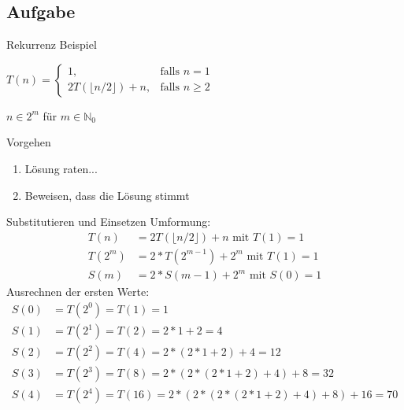 \documentclass[18pt]{beamer}
\begin{document}
\subsection{Aufgabe}
\begin{frame}{Rekurrenz Beispiel}
	\begin{center}
		$ T(n)=\left\{\begin{array}{cr} 1, & \mbox{falls } n = 1\\ 2 T(\lfloor n / 2 \rfloor) + n, & \mbox{falls } n \geq 2 \end{array}\right. $

		\parskip 14pt
		$n \in 2 ^{m} $ für $ m \in \mathbb{N} _{0} $

	\end{center}
	\begin{block}{Vorgehen}
		\begin{enumerate}
			\item Lösung raten...
			\item Beweisen, dass die Lösung stimmt
		\end{enumerate}
	\end{block}
\end{frame}

\begin{frame}{Substitutieren und Einsetzen}
	Umformung:
	\begin{align*}
		T(n) &= 2 T(\lfloor n / 2 \rfloor) + n \text{ mit } T(1) = 1\\
		T(2^m) &= 2* T(2^{m - 1}) + 2^m \text{ mit } T(1) = 1\\
		S(m) &= 2 * S(m-1) + 2^m \text{ mit } S(0) = 1
	\end{align*}
	Ausrechnen der ersten Werte:
	\begin{align*}
		S(0) &= T(2^0) = T(1)  = 1\\
		S(1) &= T(2^1) = T(2)  = 2 * 1 + 2 = 4\\
		S(2) &= T(2^2) = T(4)  = 2 * (2 * 1 + 2) + 4 = 12\\
		S(3) &= T(2^3) = T(8)  = 2 * (2 * (2 * 1 + 2) + 4 ) + 8 = 32\\
		S(4) &= T(2^4) = T(16) = 2 * ( 2 * (2 * (2 * 1 + 2) + 4 ) + 8 ) + 16 = 70
	\end{align*}
\end{frame}
\end{document}
